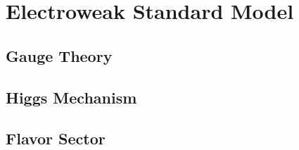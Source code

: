 \chapter{Electroweak Standard Model}

\section{Gauge Theory}

\section{Higgs Mechanism}

\section{Flavor Sector}
